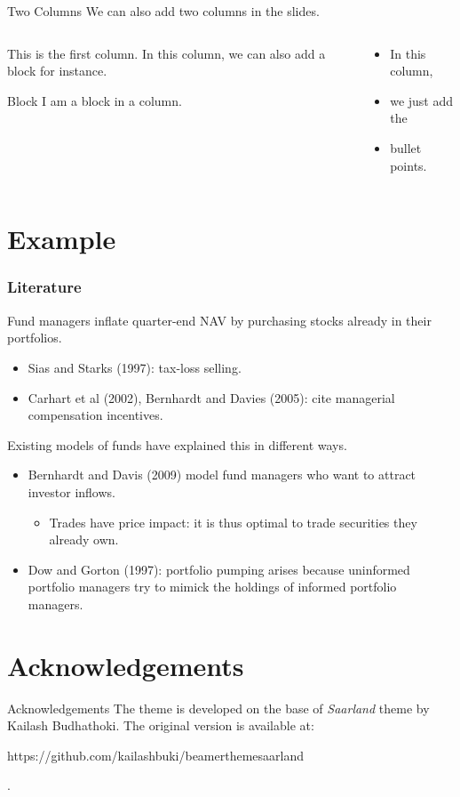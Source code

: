 \documentclass[aspectratio=169]{beamer}
\begin{document}
	\begin{frame}{Two Columns}
		We can also add two columns in the slides.
		\begin{columns}[t]
			\begin{column}[T]{0.4\textwidth}
				This is the first column. In this column, we can also add a block for instance.
				\vspace{1em}
				\begin{block}{Block}
					I am a block in a column.
				\end{block}
			\end{column}
			\begin{column}[T]{0.4\textwidth}
				\begin{itemize}
					\item In this column,
					\item we just add the
					\item bullet points.
				\end{itemize}
			\end{column}
		\end{columns}
	\end{frame}


\section{Example}

\begin{frame}
\frametitle{Literature}
Fund managers inflate quarter-end NAV by purchasing stocks already in their portfolios.

\begin{itemize}
\item Sias and Starks (1997): tax-loss selling.
\item Carhart et al (2002), Bernhardt and Davies (2005): cite managerial compensation incentives.
\end{itemize}
Existing models of funds have explained this in different ways.

\begin{itemize}
\item Bernhardt and Davis (2009) model fund managers who want to attract investor inflows.
\begin{itemize}
\item Trades have price impact: it is thus optimal to trade securities they already own.
\end{itemize}
\item Dow and Gorton (1997): portfolio pumping arises because uninformed portfolio managers try to mimick the holdings of informed portfolio managers.
\end{itemize}
\end{frame}

\section{Acknowledgements}

\begin{frame}{Acknowledgements}
		The theme is developed on the base of \textsl{Saarland} theme by Kailash Budhathoki. The original version is available at:
		\begin{url}
		https://github.com/kailashbuki/beamerthemesaarland
		\end{url}.
\end{frame}
	
		
		
	
\end{document}
